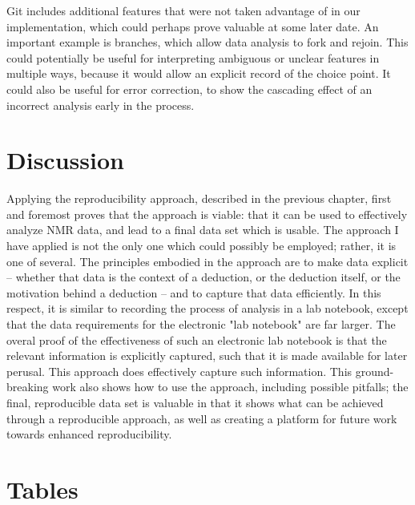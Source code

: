 Git includes additional features that were not taken advantage of in our
implementation, which could perhaps prove valuable at some later date.  An
important example is branches, which allow data analysis to fork and rejoin.
This could potentially be useful for interpreting ambiguous or unclear features
in multiple ways, because it would allow an explicit record of the choice point.
It could also be useful for error correction, to show the cascading effect of
an incorrect analysis early in the process.


\section{Discussion}
Applying the reproducibility approach, described in the previous chapter, first
and foremost proves that the approach is viable: that it can be used to 
effectively analyze NMR data, and lead to a final data set which is usable.  
The approach I have applied is not the only one 
which could possibly be employed; rather, it is one of several.  The principles
embodied in the approach are to make data explicit -- whether that data is the
context of a deduction, or the deduction itself, or the motivation behind a
deduction -- and to capture that data efficiently.  In this respect, it is 
similar to recording the process of analysis in a lab notebook, except that 
the data requirements for the electronic "lab notebook" are far larger.
The overal proof of the effectiveness of such an electronic lab notebook is
that the relevant information is explicitly captured, such that it is made
available for later perusal.  This approach does effectively capture such 
information.  This ground-breaking work also shows how to
use the approach, including possible pitfalls;  the final, reproducible data
set is valuable in that it shows what can be achieved through a reproducible
approach, as well as creating a platform for future work towards enhanced
reproducibility.


\clearpage
\section{Tables}

